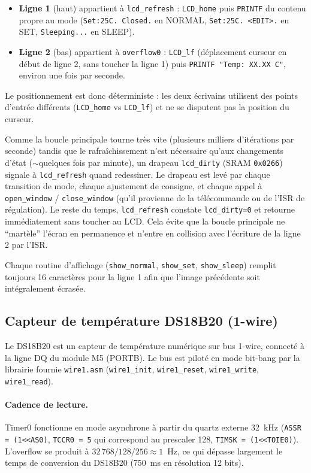 \documentclass[11pt]{article}
\begin{document}
\begin{itemize}
  \item \textbf{Ligne 1} (haut) appartient à \texttt{lcd\_refresh} : \texttt{LCD\_home} puis \texttt{PRINTF} du contenu propre au mode (\texttt{Set:25C. Closed.} en NORMAL, \texttt{Set:25C. <EDIT>.} en SET, \texttt{Sleeping...} en SLEEP).
  \item \textbf{Ligne 2} (bas) appartient à \texttt{overflow0} : \texttt{LCD\_lf} (déplacement curseur en début de ligne 2, sans toucher la ligne 1) puis \texttt{PRINTF "Temp: XX.XX C"}, environ une fois par seconde.
\end{itemize}

Le positionnement est donc déterministe : les deux écrivains utilisent des points d'entrée différents (\texttt{LCD\_home} vs \texttt{LCD\_lf}) et ne se disputent pas la position du curseur.

Comme la boucle principale tourne très vite (plusieurs milliers d'itérations par seconde) tandis que le rafraîchissement n'est nécessaire qu'aux changements d'état (${\sim}$quelques fois par minute), un drapeau \texttt{lcd\_dirty} (SRAM \texttt{0x0266}) signale à \texttt{lcd\_refresh} quand redessiner. Le drapeau est levé par chaque transition de mode, chaque ajustement de consigne, et chaque appel à \texttt{open\_window} / \texttt{close\_window} (qu'il provienne de la télécommande ou de l'ISR de régulation). Le reste du temps, \texttt{lcd\_refresh} constate \texttt{lcd\_dirty=0} et retourne immédiatement sans toucher au LCD. Cela évite que la boucle principale ne ``martèle'' l'écran en permanence et n'entre en collision avec l'écriture de la ligne 2 par l'ISR.

Chaque routine d'affichage (\texttt{show\_normal}, \texttt{show\_set}, \texttt{show\_sleep}) remplit toujours 16 caractères pour la ligne 1 afin que l'image précédente soit intégralement écrasée.

\subsection{Capteur de température DS18B20 (1-wire)}

Le DS18B20 est un capteur de température numérique sur bus 1-wire, connecté à la ligne DQ du module M5 (PORTB). Le bus est piloté en mode bit-bang par la librairie fournie \texttt{wire1.asm} (\texttt{wire1\_init}, \texttt{wire1\_reset}, \texttt{wire1\_write}, \texttt{wire1\_read}).

\paragraph{Cadence de lecture.} Timer0 fonctionne en mode asynchrone à partir du quartz externe 32~kHz (\texttt{ASSR = (1{<}{<}AS0)}, \texttt{TCCR0 = 5} qui correspond au prescaler 128, \texttt{TIMSK = (1{<}{<}TOIE0)}). L'overflow se produit à $32\,768 / 128 / 256 \approx 1$~Hz, ce qui dépasse largement le temps de conversion du DS18B20 (750~ms en résolution 12 bits).
\end{document}
